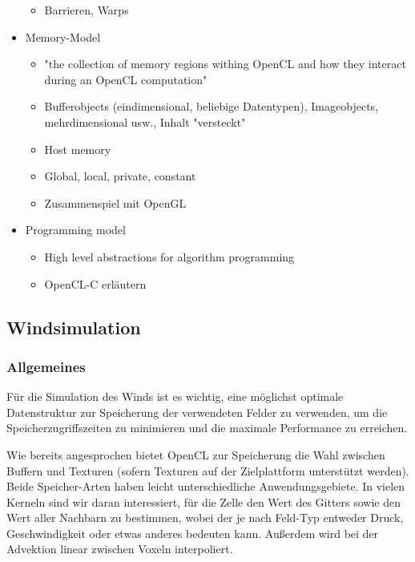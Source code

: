 \begin{itemize}
\begin{itemize}
            \item Barrieren, Warps
    \end{itemize}
\item Memory-Model
    \begin{itemize}
            \item "the collection of memory regions withing OpenCL and how they interact during an OpenCL computation"
            \item Bufferobjects (eindimensional, beliebige Datentypen), Imageobjects, mehrdimensional usw., Inhalt "versteckt"
            \item Host memory
            \item Global, local, private, constant
            \item Zusammenspiel mit OpenGL
    \end{itemize}
\item Programming model
\begin{itemize}
    \item High level abstractions for algorithm programming
    \item OpenCL-C erläutern
\end{itemize}
\end{itemize}

\subsection{Windsimulation}

\subsubsection{Allgemeines}

Für die Simulation des Winds ist es wichtig, eine möglichst optimale
Datenstruktur zur Speicherung der verwendeten Felder zu verwenden, um
die Speicherzugriffszeiten zu minimieren und die maximale Performance zu
erreichen.

Wie bereits angesprochen bietet OpenCL zur Speicherung die Wahl zwischen Buffern
und Texturen (sofern Texturen auf der Zielplattform unterstützt werden). Beide
Speicher-Arten haben leicht unterschiedliche Anwendungsgebiete. In vielen
Kerneln sind wir daran interessiert, für die  Zelle den
Wert des Gitters sowie den Wert aller Nachbarn zu bestimmen, wobei der
 je nach Feld-Typ entweder Druck, Geschwindigkeit oder etwas
anderes bedeuten kann. Außerdem wird bei der Advektion linear zwischen Voxeln
interpoliert.

